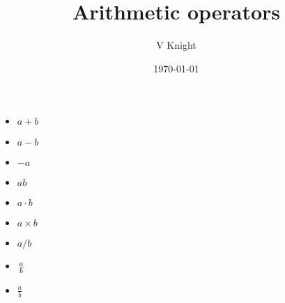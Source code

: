 \documentclass{article}
\title{Arithmetic operators}
\author{V Knight}
\date{\today}
\begin{document}
\maketitle

\begin{itemize}
	\item \(a+b\)
	\item \(a-b\)
	\item \(-a\)
	\item \(ab\)
	\item \(a\cdot b\)
	\item \(a\times b\)
	\item \(a/b\)
	\item \({a\over b}\)
	\item \(\frac{a}{b}\)
\end{itemize}
\end{document}
